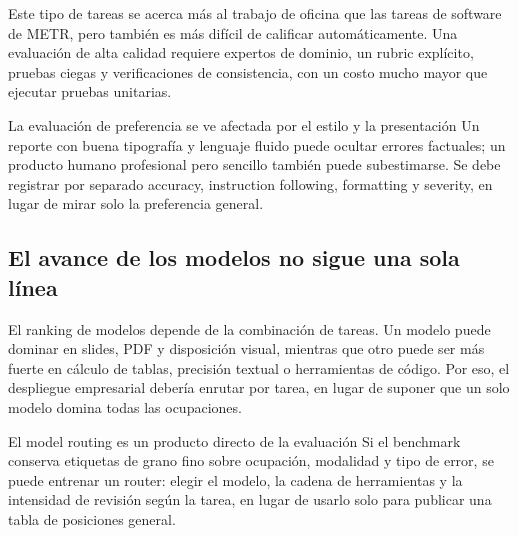 
Este tipo de tareas se acerca más al trabajo de oficina que las tareas de software de METR, pero también es más difícil de calificar automáticamente. Una evaluación de alta calidad requiere expertos de dominio, un rubric explícito, pruebas ciegas y verificaciones de consistencia, con un costo mucho mayor que ejecutar pruebas unitarias.

\begin{warningbox}{La evaluación de preferencia se ve afectada por el estilo y la presentación}
Un reporte con buena tipografía y lenguaje fluido puede ocultar errores factuales; un producto humano profesional pero sencillo también puede subestimarse. Se debe registrar por separado accuracy, instruction following, formatting y severity, en lugar de mirar solo la preferencia general.
\end{warningbox}

\subsection{El avance de los modelos no sigue una sola línea}



El ranking de modelos depende de la combinación de tareas. Un modelo puede dominar en slides, PDF y disposición visual, mientras que otro puede ser más fuerte en cálculo de tablas, precisión textual o herramientas de código. Por eso, el despliegue empresarial debería enrutar por tarea, en lugar de suponer que un solo modelo domina todas las ocupaciones.

\begin{knowledgebox}{El model routing es un producto directo de la evaluación}
Si el benchmark conserva etiquetas de grano fino sobre ocupación, modalidad y tipo de error, se puede entrenar un router: elegir el modelo, la cadena de herramientas y la intensidad de revisión según la tarea, en lugar de usarlo solo para publicar una tabla de posiciones general.
\end{knowledgebox}

